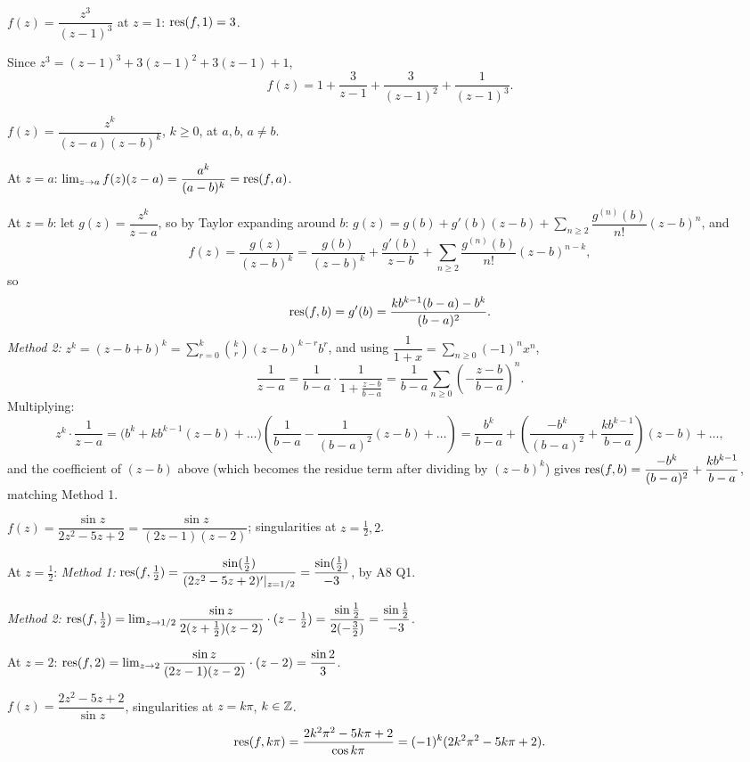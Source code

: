 \documentclass[11pt]{article}
\begin{document}
\begin{example}
$f(z) = \dfrac{z^3}{(z-1)^3}$ at $z=1$: $\operatorname{res}(f,1) = 3$.

Since $z^3 = (z-1)^3+3(z-1)^2+3(z-1)+1$,
\[
f(z) = 1 + \frac{3}{z-1} + \frac{3}{(z-1)^2} + \frac{1}{(z-1)^3}.
\]
\end{example}

\begin{example}
$f(z) = \dfrac{z^k}{(z-a)(z-b)^k}$, $k\ge0$, at $a,b$, $a\ne b$.

At $z=a$: $\lim_{z\to a} f(z)(z-a) = \dfrac{a^k}{(a-b)^k} = \operatorname{res}(f,a)$.

At $z=b$: let $g(z) = \dfrac{z^k}{z-a}$, so by Taylor expanding around $b$: $g(z) = g(b) + g'(b)(z-b) + \sum_{n\ge2} \dfrac{g^{(n)}(b)}{n!}(z-b)^n$, and
\[
f(z) = \frac{g(z)}{(z-b)^k} = \frac{g(b)}{(z-b)^k} + \frac{g'(b)}{z-b} + \sum_{n\ge2} \frac{g^{(n)}(b)}{n!}(z-b)^{n-k},
\]
so
\[
\operatorname{res}(f,b) = g'(b) = \frac{k b^{k-1}(b-a) - b^k}{(b-a)^2}.
\]
\emph{Method 2:} $z^k = (z-b+b)^k = \sum_{r=0}^k \binom{k}{r}(z-b)^{k-r}b^r$, and using $\dfrac{1}{1+x}=\sum_{n\ge0}(-1)^nx^n$,
\[
\frac{1}{z-a} = \frac{1}{b-a}\cdot\frac{1}{1+\frac{z-b}{b-a}} = \frac{1}{b-a}\sum_{n\ge0}\left(-\frac{z-b}{b-a}\right)^n.
\]
Multiplying:
\[
z^k\cdot\frac{1}{z-a} = \big(b^k+kb^{k-1}(z-b)+\dots\big)\left(\frac{1}{b-a} - \frac{1}{(b-a)^2}(z-b)+\dots\right) = \frac{b^k}{b-a} + \left(\frac{-b^k}{(b-a)^2}+\frac{kb^{k-1}}{b-a}\right)(z-b)+\dots,
\]
and the coefficient of $(z-b)$ above (which becomes the residue term after dividing by $(z-b)^k$) gives $\operatorname{res}(f,b) = \dfrac{-b^k}{(b-a)^2}+\dfrac{kb^{k-1}}{b-a}$, matching Method 1.
\end{example}

\begin{example}
$f(z) = \dfrac{\sin z}{2z^2-5z+2} = \dfrac{\sin z}{(2z-1)(z-2)}$; singularities at $z=\frac12,2$.

At $z=\frac12$: \emph{Method 1:} $\operatorname{res}(f,\tfrac12) = \dfrac{\sin(\tfrac12)}{(2z^2-5z+2)'|_{z=1/2}} = \dfrac{\sin(\tfrac12)}{-3}$, by A8 Q1.

\emph{Method 2:} $\operatorname{res}(f,\tfrac12) = \lim_{z\to1/2} \dfrac{\sin z}{2(z+\tfrac12)(z-2)}\cdot(z-\tfrac12) = \dfrac{\sin\tfrac12}{2(-\tfrac32)} = \dfrac{\sin\tfrac12}{-3}$.

At $z=2$: $\operatorname{res}(f,2) = \lim_{z\to2} \dfrac{\sin z}{(2z-1)(z-2)}\cdot(z-2) = \dfrac{\sin2}{3}$.
\end{example}

\begin{example}
$f(z) = \dfrac{2z^2-5z+2}{\sin z}$, singularities at $z=k\pi$, $k\in{\mathbb{Z}}$.
\[
\operatorname{res}(f,k\pi) = \frac{2k^2\pi^2-5k\pi+2}{\cos k\pi} = (-1)^k(2k^2\pi^2-5k\pi+2).
\]
\end{example}
\end{document}
